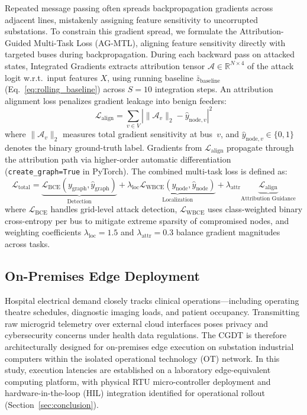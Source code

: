 \documentclass[runningheads]{llncs}
\begin{document}
Repeated message passing often spreads backpropagation gradients across adjacent lines, mistakenly assigning feature sensitivity to uncorrupted substations.
To constrain this gradient spread, we formulate the Attribution-Guided Multi-Task Loss (AG-MTL), aligning feature sensitivity directly with targeted buses during backpropagation.
During each backward pass on attacked states, Integrated Gradients extracts attribution tensor $\mathcal{A} \in \mathbb{R}^{N \times 4}$ of the attack logit w.r.t.\ input features $X$, using running baseline $\bar{z}_{\mathrm{baseline}}$ (Eq.~\ref{eq:rolling_baseline}) across $S = 10$ integration steps.
An attribution alignment loss penalizes gradient leakage into benign feeders:
\begin{equation}
\mathcal{L}_{\mathrm{align}} = \sum_{v \in V} \left| \|\mathcal{A}_{v}\|_{2} - \hat{y}_{\mathrm{node},v} \right|^{2}
\label{eq:align_loss}
\end{equation}
where $\|\mathcal{A}_{v}\|_{2}$ measures total gradient sensitivity at bus~$v$, and $\hat{y}_{\mathrm{node},v} \in \{0, 1\}$ denotes the binary ground-truth label.
Gradients from $\mathcal{L}_{\mathrm{align}}$ propagate through the attribution path via higher-order automatic differentiation (\texttt{create\_graph=True} in PyTorch).
The combined multi-task loss is defined as:
\begin{equation}
\mathcal{L}_{\mathrm{total}} = \underbrace{\mathcal{L}_{\mathrm{BCE}}(y_{\mathrm{graph}}, \hat{y}_{\mathrm{graph}})}_{\text{Detection}} + \lambda_{\mathrm{loc}} \underbrace{\mathcal{L}_{\mathrm{WBCE}}(y_{\mathrm{node}}, \hat{y}_{\mathrm{node}})}_{\text{Localization}} + \lambda_{\mathrm{attr}} \underbrace{\mathcal{L}_{\mathrm{align}}}_{\text{Attribution Guidance}}
\label{eq:total_loss}
\end{equation}
where $\mathcal{L}_{\mathrm{BCE}}$ handles grid-level attack detection, $\mathcal{L}_{\mathrm{WBCE}}$ uses class-weighted binary cross-entropy per bus to mitigate extreme sparsity of compromised nodes, and weighting coefficients $\lambda_{\mathrm{loc}} = 1.5$ and $\lambda_{\mathrm{attr}} = 0.3$ balance gradient magnitudes across tasks.

\subsection{On-Premises Edge Deployment}

Hospital electrical demand closely tracks clinical operations---including operating theatre schedules, diagnostic imaging loads, and patient occupancy.
Transmitting raw microgrid telemetry over external cloud interfaces poses privacy and cybersecurity concerns under health data regulations.
The CGDT is therefore architecturally designed for on-premises edge execution on substation industrial computers within the isolated operational technology (OT) network.
In this study, execution latencies are established on a laboratory edge-equivalent computing platform, with physical RTU micro-controller deployment and hardware-in-the-loop (HIL) integration identified for operational rollout (Section~\ref{sec:conclusion}).
\end{document}
